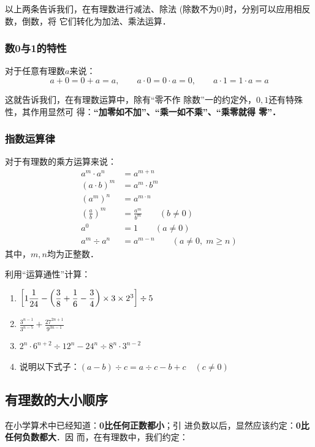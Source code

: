 以上两条告诉我们，在有理数进行减法、除法
(除数不为0)时，分别可以应用相反数，倒数，将
它们转化为加法、乘法运算．

\subsubsection{数0与1的特性}
\begin{blk}{}
    对于任意有理数$a$来说：
\[a+0=0+a=a,\qquad  a\cdot 0=0\cdot a=0,\qquad a\cdot 1=1\cdot a=a\]
\end{blk}

    这就告诉我们，在有理数运算中，除有“零不作
除数”一的约定外，$0,  1$还有特殊性，其作用显然可
得：\textbf{“加零如不加”、“乘一如不乘”、“乘零就得
零”．}

\subsubsection{指数运算律}
    \begin{blk}{}
    对于有理数的乘方运算来说：
\[\begin{split}
a^m\cdot a^n&=a^{m+n}\\
(a\cdot b)^m&=a^{m}\cdot b^m\\
(a^m)^n&=a^{m\cdot n}\\
\left(\frac{a}{b}\right)^m&=\frac{a^m}{b^m}\qquad (b\ne 0)\\
a^0&=1\qquad (a\ne 0)\\
a^m\div a^n&=a^{m-n} \qquad (a\ne 0,\; m\ge n)
\end{split}\]
其中，$m, n$均为正整数．
    \end{blk}

\begin{ex}
    利用“运算通性”计算：
    \begin{enumerate}
        \item $\left[1\dfrac{1}{24}-\left(\dfrac{3}{8}+\dfrac{1}{6}-\dfrac{3}{4}\right)\times3\times2^3\right]\div 5$
        \item $\frac{3^{n-1}}{3^{n-5}}+\frac{27^{2n+1}}{9^{3n-1}}$
        \item $2^n\cdot 6^{n+2}\div 12^n-24^n\div 8^n\cdot 3^{n-2}$
        \item 说明以下式子：$(a-b)\div c=a\div c-b+c\quad (c\ne 0)$
    \end{enumerate}

\end{ex}

\subsection{有理数的大小顺序}
    在小学算术中已经知道：\textbf{0比任何正数都小}；引
进负数以后，显然应该约定：\textbf{0比任何负数都大}．因
而，在有理数中，我们约定：

